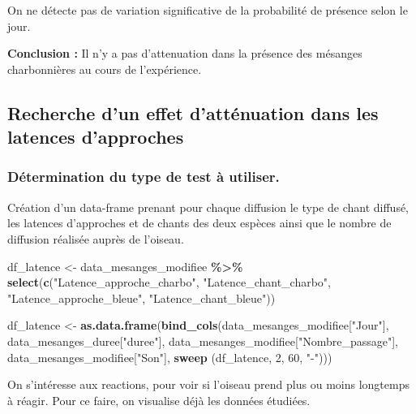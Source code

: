 \documentclass[
  french,
]{article}
\newenvironment{Shaded}{\begin{snugshade}}{\end{snugshade}}
\newcommand{\DecValTok}[1]{\textcolor[rgb]{0.00,0.00,0.81}{#1}}
\newcommand{\FunctionTok}[1]{\textcolor[rgb]{0.13,0.29,0.53}{\textbf{#1}}}
\newcommand{\NormalTok}[1]{#1}
\newcommand{\OtherTok}[1]{\textcolor[rgb]{0.56,0.35,0.01}{#1}}
\newcommand{\SpecialCharTok}[1]{\textcolor[rgb]{0.81,0.36,0.00}{\textbf{#1}}}
\newcommand{\StringTok}[1]{\textcolor[rgb]{0.31,0.60,0.02}{#1}}
\begin{document}
On ne détecte pas de variation significative de la probabilité de
présence selon le jour.

\textbf{Conclusion :} Il n'y a pas d'attenuation dans la présence des
mésanges charbonnières au cours de l'expérience.

\subsection{Recherche d'un effet d'atténuation dans les latences
d'approches}\label{recherche-dun-effet-dattuxe9nuation-dans-les-latences-dapproches}

\subsubsection{Détermination du type de test à
utiliser.}\label{duxe9termination-du-type-de-test-uxe0-utiliser.}

Création d'un data-frame prenant pour chaque diffusion le type de chant
diffusé, les latences d'approches et de chants des deux espèces ainsi
que le nombre de diffusion réalisée auprès de l'oiseau.

\begin{Shaded}
\begin{Highlighting}[]
\NormalTok{df\_latence }\OtherTok{\textless{}{-}}\NormalTok{ data\_mesanges\_modifiee }\SpecialCharTok{\%\textgreater{}\%} \FunctionTok{select}\NormalTok{(}\FunctionTok{c}\NormalTok{(}\StringTok{"Latence\_approche\_charbo"}\NormalTok{, }\StringTok{"Latence\_chant\_charbo"}\NormalTok{, }\StringTok{"Latence\_approche\_bleue"}\NormalTok{, }\StringTok{"Latence\_chant\_bleue"}\NormalTok{))}

\NormalTok{df\_latence }\OtherTok{\textless{}{-}} \FunctionTok{as.data.frame}\NormalTok{(}\FunctionTok{bind\_cols}\NormalTok{(data\_mesanges\_modifiee[}\StringTok{"Jour"}\NormalTok{], data\_mesanges\_duree[}\StringTok{"duree"}\NormalTok{], data\_mesanges\_modifiee[}\StringTok{"Nombre\_passage"}\NormalTok{], data\_mesanges\_modifiee[}\StringTok{"Son"}\NormalTok{], }\FunctionTok{sweep}\NormalTok{ (df\_latence, }\DecValTok{2}\NormalTok{, }\DecValTok{60}\NormalTok{, }\StringTok{"{-}"}\NormalTok{)))}
\end{Highlighting}
\end{Shaded}

On s'intéresse aux reactions, pour voir si l'oiseau prend plus ou moins
longtemps à réagir. Pour ce faire, on visualise déjà les données
étudiées.
\end{document}
